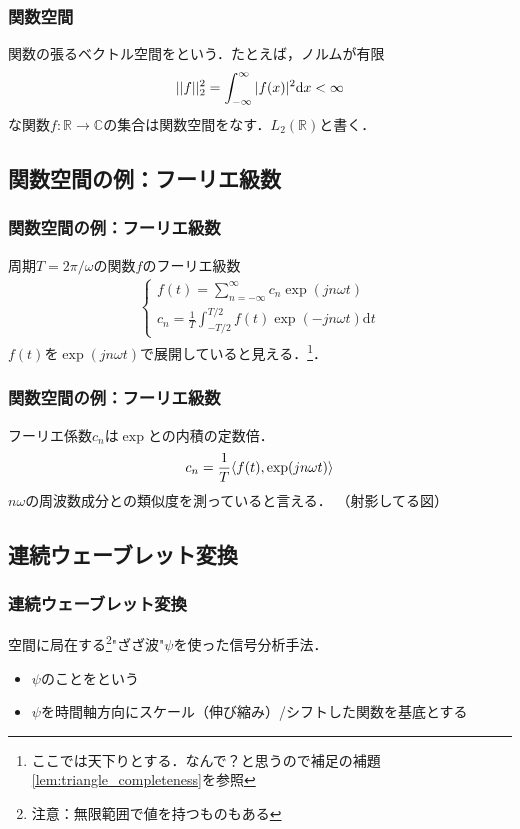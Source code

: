 \documentclass[dvipdfmx,graphicx,14pt]{beamer}
\begin{document}
\begin{frame}[c]
    \frametitle{関数空間}
    関数の張るベクトル空間をという．たとえば，ノルムが有限
    \begin{align*}
        ||f||_{2}^{2} = \int_{-\infty}^{\infty} |f(x)|^{2} \mathrm{d}x < \infty
    \end{align*}
    な関数$f:\mathbb{R} \to \mathbb{C}$の集合は関数空間をなす．$L_{2}(\mathbb{R})$と書く．
\end{frame}

\subsection{関数空間の例：フーリエ級数}

\begin{frame}[c]
    \frametitle{関数空間の例：フーリエ級数}
    周期$T=2\pi/\omega$の関数$f$のフーリエ級数
    \begin{align}
        \left\{
            \begin{array}{l}
                \displaystyle f(t)  = \sum_{n=-\infty}^{\infty} c_{n} \exp(jn\omega t) \\
                \displaystyle c_{n} = \frac{1}{T} \int_{-T/2}^{T/2} f(t) \exp(-jn\omega t) \mathrm{d}t
            \end{array}
        \right. \label{eq:fourior_seq}
    \end{align}
    $f(t)$を$\exp(jn\omega t)$で展開していると見える．\footnote{ここでは天下りとする．なんで？と思うので補足の補題\ref{lem:triangle_completeness}を参照}．
\end{frame}

\begin{frame}[c]
    \frametitle{関数空間の例：フーリエ級数}
    フーリエ係数$c_{n}$は$\exp$との内積の定数倍．
    \begin{align}
        c_{n} = \frac{1}{T} \langle f(t), \exp(jn\omega t) \rangle
    \end{align}
    $n\omega$の周波数成分との類似度を測っていると言える．
    （射影してる図）
\end{frame}

\subsection{連続ウェーブレット変換}

\begin{frame}[c]
    \frametitle{連続ウェーブレット変換}
    空間に局在する\footnote{注意：無限範囲で値を持つものもある}"ざざ波"$\psi$を使った信号分析手法．
    \begin{itemize}
        \item $\psi$のことをという
        \item $\psi$を時間軸方向にスケール（伸び縮み）/シフトした関数を基底とする
    \end{itemize}
\end{frame}
\end{document}
